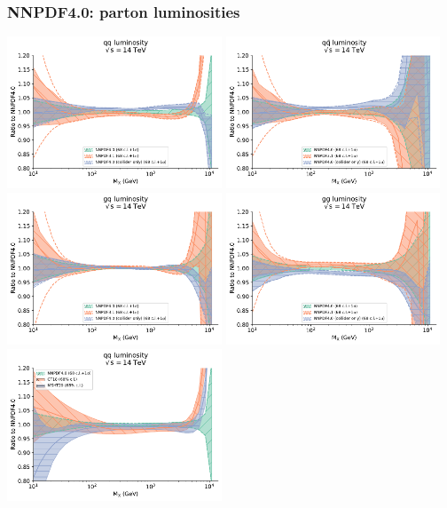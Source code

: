 \documentclass{beamer}
\begin{document}
\begin{frame}
 \frametitle{NNPDF4.0: parton luminosities}
 \footnotesize
 \centering
 \begin{overlayarea}{\textwidth}{10cm}
  {
   \includegraphics[width=0.48\textwidth]{plots/lumi_qq_1}
   \includegraphics[width=0.48\textwidth]{plots/lumi_qqbar_1}\\
   \includegraphics[width=0.48\textwidth]{plots/lumi_gq_1}
   \includegraphics[width=0.48\textwidth]{plots/lumi_gg_1}\\
  }
  {
   \includegraphics[width=0.48\textwidth]{plots/lumi_qq_2}
}
\end{overlayarea}
\end{frame}
\end{document}
